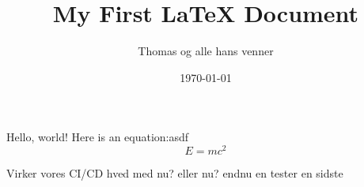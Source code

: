 \documentclass{article}
\title{My First LaTeX Document}
\author{Thomas og alle hans venner}
\date{\today}
\begin{document}
\maketitle

Hello, world! Here is an equation:asdf
\[
E = mc^2
\]

Virker vores CI/CD hved med nu? eller nu? endnu en tester en sidste 
\end{document}

